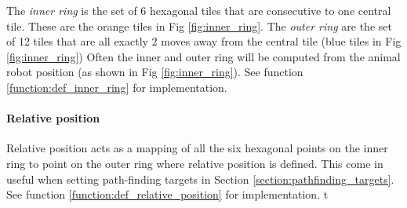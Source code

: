 The \textit{inner ring} is the set of 6 hexagonal tiles that are consecutive to one central tile. These are the orange tiles in Fig \ref{fig:inner_ring}.
The \textit{outer ring} are the set of 12 tiles that are all exactly 2 moves away from the central tile (blue tiles in Fig \ref{fig:inner_ring})
Often the inner and outer ring will be computed from the animal robot position (as shown in Fig \ref{fig:inner_ring}). See function \ref{function:def_inner_ring} for implementation.

\paragraph{Relative position}

Relative position acts as a mapping of all the six hexagonal points on the inner ring to point on the outer ring where relative position is defined. This come in useful when setting path-finding targets in Section \ref{section:pathfinding_targets}.
See function \ref{function:def_relative_position} for implementation. t


